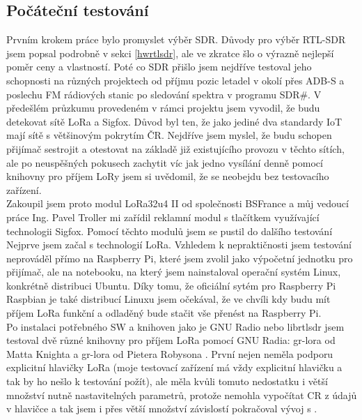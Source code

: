 \documentclass{ctuthesis}
\begin{document}
\subsection{Počáteční testování}
Prvním krokem práce bylo promyslet výběr SDR. Důvody pro výběr RTL-SDR jsem popsal podrobně v sekci \ref{hwrtlsdr}, ale ve zkratce šlo o výrazně nejlepší poměr ceny a vlastností. Poté co SDR přišlo jsem nejdříve testoval jeho schopnosti na různých projektech od příjmu pozic letadel v okolí přes ADB-S a poslechu FM rádiových stanic po sledování spektra v programu SDR\#.
V předešlém průzkumu provedeném v rámci projektu jsem vyvodil, že budu detekovat sítě LoRa a Sigfox. Důvod byl ten, že jako jediné dva standardy IoT mají sítě s většinovým pokrytím ČR. Nejdříve jsem myslel, že budu schopen přijímač sestrojit a otestovat na základě již existujícího provozu v těchto sítích, ale po neuspěšných pokusech zachytit víc jak jedno vysílání denně pomocí knihovny pro příjem LoRy jsem si uvědomil, že se neobejdu bez testovacího zařízení.\\
Zakoupil jsem proto modul LoRa32u4 II od společnosti BSFrance a můj vedoucí práce Ing. Pavel Troller mi zařídil reklamní modul s tlačítkem využívající technologii Sigfox. Pomocí těchto modulů jsem se pustil do dalšího testování\\
Nejprve jsem začal s technologií LoRa. Vzhledem k nepraktičnosti jsem testování neprováděl přímo na Raspberry Pi, které jsem zvolil jako výpočetní jednotku pro přijímač, ale na notebooku, na který jsem  nainstaloval operační systém Linux, konkrétně distribuci Ubuntu. Díky tomu, že oficiální sytém pro Raspberry Pi Raspbian je také distribucí Linuxu jsem očekával, že ve chvíli kdy budu mít příjem LoRa funkční a odladěný bude stačit vše přenést na Raspberry Pi.\\
Po instalaci potřebného SW a knihoven jako je GNU Radio nebo librtlsdr jsem testoval dvě různé knihovny pro příjem LoRa pomocí GNU Radia: gr-lora od Matta Knighta\cite{mattknight} a gr-lora od Pietera Robysona \cite{pieterrobynson}. První nejen neměla podporu explicitní hlavičky LoRa (moje testovací zařízení má vždy explicitní hlavičku a tak by ho nešlo k testování požít), ale měla kvůli tomuto nedostatku i větší množství nutně nastavitelných parametrů, protože nemohla vypočítat CR z údajů v hlavičce a tak jsem i přes větší množství závislostí pokračoval vývoj s \cite{pieterrobynson}. \\
\end{document}

